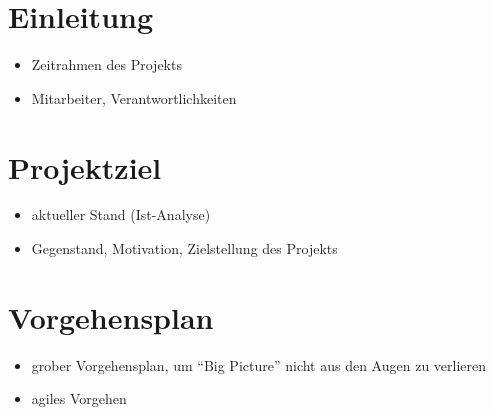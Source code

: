\documentclass[12pt, oneside, smallheadings]{scrbook}
\begin{document}



\setcounter{page}{1}
\setcounter{tocdepth}{1}

\clearpage
{}
\tableofcontents
\thispagestyle{plain}

\printglossary[type=\acronymtype, title=Akronymverzeichnis,toctitle=Akronymverzeichnis]




\clearpage
{}
\setcounter{page}{1}

\pagestyle{scrheadings}

\chapter{Einleitung} 
\begin{itemize}
	\item Zeitrahmen des Projekts
	\item Mitarbeiter, Verantwortlichkeiten
\end{itemize}

\chapter{Projektziel}
\begin{itemize}
	\item aktueller Stand (Ist-Analyse)
	\item Gegenstand, Motivation, Zielstellung des Projekts
\end{itemize}

\chapter{Vorgehensplan}
\begin{itemize}
	\item grober Vorgehensplan, um "`Big Picture"' nicht aus den Augen zu verlieren
	\item agiles Vorgehen

\end{itemize}
\end{document}
